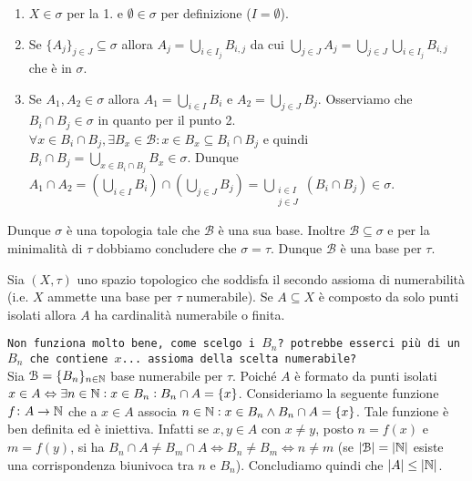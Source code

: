 \begin{enumerate}[label= (\roman*)]
\item $ X \in \sigma $ per la 1. e $ \emptyset \in \sigma $ per definizione ($ I = \emptyset $).
\item Se $ \{A_j\}_{j \in J} \subseteq \sigma $ allora $ A_j = \bigcup_{i \in I_j} B_{i, j} $ da cui $ \bigcup_{j \in J} A_j = \bigcup_{j \in J} \bigcup_{i \in I_j} B_{i, j} $ che è in $ \sigma $.
\item Se $ A_1, A_2 \in \sigma $ allora $ A_1 = \bigcup_{i \in I} B_{i} $ e $ A_2 = \bigcup_{j \in J} B_{j} $. Osserviamo che $ B_{i} \cap B_{j} \in \sigma $ in quanto per il punto 2. $ \forall x \in B_{i} \cap B_{j}, \exists B_x \in \mathcal{B} : x \in B_x \subseteq B_{i} \cap B_{j} $ e quindi $ B_{i} \cap B_{j} = \bigcup_{x \in B_{i} \cap B_{j}} B_x \in \sigma $. Dunque $ A_1 \cap A_2 = (\bigcup_{i \in I} B_{i}) \cap (\bigcup_{j \in J} B_{j}) = \bigcup_{\substack{i \in I \\ j \in J}} (B_{i} \cap B_{j}) \in \sigma $.
\end{enumerate}
Dunque $ \sigma $ è una topologia tale che $ \mathcal{B} $ è una sua base. Inoltre $ \mathcal{B} \subseteq \sigma $ e per la minimalità di $ \tau $ dobbiamo concludere che $ \sigma = \tau $. Dunque $ \mathcal{B} $ è una base per $ \tau $.

\begin{es}
  Sia $ (X, \tau) $ uno spazio topologico che soddisfa il secondo assioma di numerabilità (i.e. $ X $ ammette una base per $ \tau $ numerabile). Se $ A \subseteq X $ è composto da solo punti isolati allora $ A $ ha cardinalità numerabile o finita.
\end{es}
%
\texttt{Non funziona molto bene, come scelgo i $ B_n $? potrebbe esserci più di un $ B_n $ che contiene $ x $... assioma della scelta numerabile?}\\
Sia $ \mathcal{B} = \{B_n\}_{n \in \mathbb{N}} $ base numerabile per $ \tau $. Poiché $ A $ è formato da punti isolati $ x \in A \Leftrightarrow \exists n \in \mathbb{N} : x \in B_n : B_n \cap A = \{x\} $. Consideriamo la seguente funzione $ f \colon A \to \mathbb{N} $ che a $ x \in A $ associa $ n \in \mathbb{N} : x \in B_n \wedge B_n \cap A = \{x\} $. Tale funzione è ben definita ed è iniettiva. Infatti se $ x, y \in A $ con $ x \neq y $, posto $ n = f(x) $ e $ m = f(y) $, si ha $ B_n \cap A \neq B_m \cap A \iff B_n \neq B_m \iff n \neq m $ (se $ \left|\mathcal{B}\right| = \left|\mathbb{N}\right| $ esiste una corrispondenza biunivoca tra $ n $ e $ B_n $). Concludiamo quindi che $ \left|A\right| \leq \left|\mathbb{N}\right| $.